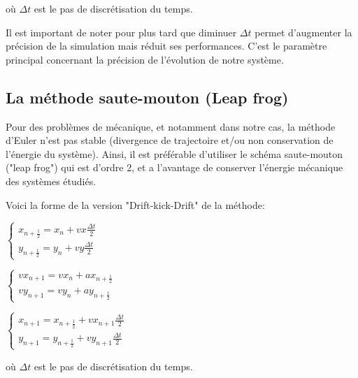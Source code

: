 \vspace{2mm}

où $\Delta t$ est le pas de discrétisation du temps.

\vspace{1mm}

Il est important de noter pour plus tard que diminuer $\Delta t$ permet d'augmenter la précision de la simulation mais réduit ses performances. C'est le paramètre principal concernant la précision de l'évolution de notre système.

\vspace{2mm}

\subsection{La méthode saute-mouton (Leap frog)}
Pour des problèmes de mécanique, et notamment dans notre cas, la méthode d'Euler n'est pas stable (divergence de trajectoire et/ou non conservation de l'énergie du système). Ainsi, il est préférable d'utiliser le schéma saute-mouton ("leap frog") qui est d'ordre 2, et a l'avantage de conserver l'énergie mécanique des systèmes étudiés.

\vspace{3mm}
Voici la forme de la version "Drift-kick-Drift" de la méthode:
\vspace{2mm}

$
\left\{
    \begin{array}{ll}
        x_{n+\frac{1}{2}} = x_n + vx \frac{\Delta t}{2} \\
        y_{n+\frac{1}{2}} = y_n + vy \frac{\Delta t}{2}
    \end{array}
\right.
$

\vspace{3mm}

$
\left\{
    \begin{array}{ll}
        vx_{n+1} = vx_n + ax_{n+\frac{1}{2}} \\
        vy_{n+1} = vy_n + ay_{n+\frac{1}{2}}
    \end{array}
\right.
$

\vspace{3mm}

$
\left\{
    \begin{array}{ll}
        x_{n+1} = x_{n+\frac{1}{2}} + vx_{n+1}\frac{\Delta t}{2}\\
        y_{n+1} = y_{n+\frac{1}{2}} + vy_{n+1}\frac{\Delta t}{2}
    \end{array}
\right.
$

\vspace{2mm}

où $\Delta t$ est le pas de discrétisation du temps.

\vspace{2mm}
